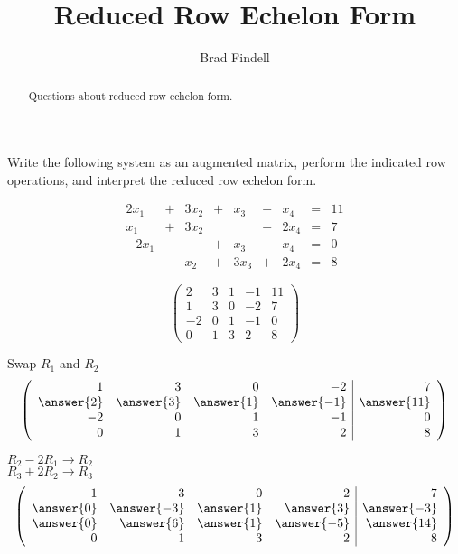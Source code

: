 \documentclass{ximera}
\title{Reduced Row Echelon Form}
\author{Brad Findell}
\begin{document}
\begin{abstract}
Questions about reduced row echelon form. 
\end{abstract}
\maketitle



\begin{exercise}
Write the following system as an augmented matrix, perform the indicated row operations, and interpret the reduced row echelon form. 

\[
\begin{array}{rcrcrcrcrc}
 2x_1 & + & 3x_2 & + & x_3  & - &  x_4 & = & 11 \\
 x_1  & + & 3x_2 &   &      & - & 2x_4 & = &  7 \\
-2x_1 &   &      & + & x_3  & - &  x_4 & = &  0 \\
      &   & x_2  & + & 3x_3 & + & 2x_4 & = &  8
\end{array}
\]

\begin{prompt}
\[
\left(\begin{array}{rrrr|r}
     2 &  3 &  1 &  -1 & 11 \\
     1 &  3 &  0 &  -2 &  7 \\
    -2 &  0 &  1 &  -1 &  0 \\
     0 &  1 &  3 &   2 &  8 
\end{array}\right)
\]

Swap $R_1$ and   $R_2$  
\[
\left(\begin{array}{rrrr|r}
     1 &  3 &  0 &  -2 &  7 \\
     \answer{2} &  \answer{3} &  \answer{1} &  \answer{-1} & \answer{11} \\
    -2 &  0 &  1 &  -1 &  0 \\
     0 &  1 &  3 &   2 &  8 
\end{array}\right)
\]

$R_2-2R_1   \rightarrow  R_2$ \\
$R_3 + 2R_2   \rightarrow R_3$
\[
\left(\begin{array}{rrrr|r}
     1 &  3 &  0 &  -2 &  7 \\
     \answer{0} &  \answer{-3} &  \answer{1} &  \answer{3} & \answer{-3} \\
     \answer{0} &  \answer{6} &  \answer{1} &  \answer{-5} &  \answer{14} \\
     0 &  1 &  3 &   2 &  8 
\end{array}\right)
\]


\end{prompt}
\end{exercise}
\end{document}

